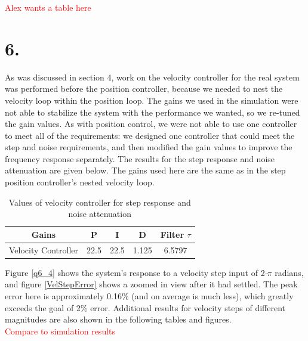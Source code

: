 \documentclass{article}
\newcommand{\xxx}[1]{\textcolor{red}{#1}}
\theoremstyle{plain}
\theoremstyle{definition}
\theoremstyle{remark}
\begin{document}
\xxx{Alex wants a table here}

\clearpage

\section*{6.}
As was discussed in section 4, work on the velocity controller for the real system was performed before the position controller, because we needed to nest the velocity loop within the position loop. The gains we used in the simulation were not able to stabilize the system with the performance we wanted, so we re-tuned the gain values. As with position control, we were not able to use one controller to meet all of the requirements: we designed one controller that could meet the step and noise requirements, and then modified the gain values to improve the frequency response separately. The results for the step response and noise attenuation are given below. The gains used here are the same as in the step position controller's nested velocity loop.\\

\begin{table}[htb]
\begin{center}
    \begin{tabular}{|c|c|c|c|c|}
        \hline
        Gains & P   & I & D     & Filter $\tau$   \\ \hline
        Velocity Controller       & 22.5   & 22.5    & 1.125    & 6.5797  \\ 
       \hline
    \end{tabular}
\end{center}
\caption{Values of velocity controller for step response and noise attenuation}
\label{velocityGains}
\end{table}

Figure \ref{q6_4} shows the system's response to a velocity step input of 2$\cdot\pi$ radians, and figure \ref{VelStepError} shows a zoomed in view after it had settled. The peak error here is approximately 0.16\% (and on average is much less), which greatly exceeds the goal of 2\% error. Additional results for velocity steps of different magnitudes are also shown in the following tables and figures.\\

\xxx{Compare to simulation results}
\end{document}
